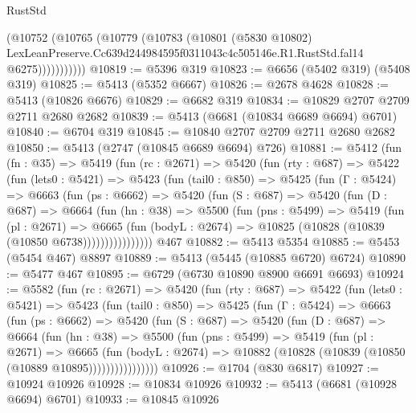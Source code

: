 \begin{lexlean}{RustStd}
\begin{coremodule}
                (@10752
                  (@10765
                    (@10779
                      (@10783
                        (@10801
                          (@5830 @10802)
                          LexLeanPreserve.Cc639d244984595f0311043c4c505146e.R1.RustStd.fal14
                          @6275)))))))))))
@10819 := @5396 @319
@10823 := @6656 (@5402 @319) (@5408 @319)
@10825 := @5413 (@5352 @6667)
@10826 := @2678 @4628
@10828 := @5413 (@10826 @6676)
@10829 := @6682 @319
@10834 := @10829 @2707 @2709 @2711 @2680 @2682
@10839 := @5413 (@6681 (@10834 @6689 @6694) @6701)
@10840 := @6704 @319
@10845 := @10840 @2707 @2709 @2711 @2680 @2682
@10850 := @5413 (@2747 (@10845 @6689 @6694) @726)
@10881 := @5412
    (fun (fn : @35) =>
    @5419
      (fun (rc : @2671) =>
      @5420
        (fun (rty : @687) =>
        @5422
          (fun (lets0 : @5421) =>
          @5423
            (fun (tail0 : @850) =>
            @5425
              (fun (Γ : @5424) =>
              @6663
                (fun (ps : @6662) =>
                @5420
                  (fun (S : @687) =>
                  @5420
                    (fun (D : @687) =>
                    @6664
                      (fun (hn : @38) =>
                      @5500
                        (fun (pns : @5499) =>
                        @5419
                          (fun (pl : @2671) =>
                          @6665
                            (fun (bodyL : @2674) =>
                            @10825 (@10828 (@10839 (@10850 @6738))))))))))))))))
    @467
@10882 := @5413 @5354
@10885 := @5453 (@5454 @467) @8897
@10889 := @5413 (@5445 (@10885 @6720) @6724)
@10890 := @5477 @467
@10895 := @6729 (@6730 @10890 @8900 @6691 @6693)
@10924 := @5582
    (fun (rc : @2671) =>
    @5420
      (fun (rty : @687) =>
      @5422
        (fun (lets0 : @5421) =>
        @5423
          (fun (tail0 : @850) =>
          @5425
            (fun (Γ : @5424) =>
            @6663
              (fun (ps : @6662) =>
              @5420
                (fun (S : @687) =>
                @5420
                  (fun (D : @687) =>
                  @6664
                    (fun (hn : @38) =>
                    @5500
                      (fun (pns : @5499) =>
                      @5419
                        (fun (pl : @2671) =>
                        @6665
                          (fun (bodyL : @2674) =>
                          @10882 (@10828 (@10839 (@10850 (@10889 @10895))))))))))))))))
@10926 := @1704 (@830 @6817)
@10927 := @10924 @10926
@10928 := @10834 @10926
@10932 := @5413 (@6681 (@10928 @6694) @6701)
@10933 := @10845 @10926

\end{coremodule}
\end{lexlean}
